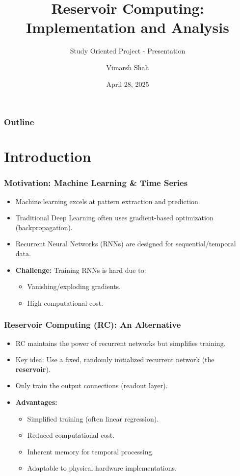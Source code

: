\documentclass{beamer}
\title[Reservoir Computing]{Reservoir Computing: Implementation and Analysis}
\subtitle{Study Oriented Project - Presentation}
\author{Vimarsh Shah}
\institute{Department of Physics \\ BITS Pilani, Goa Campus}
\date{April 28, 2025}
\begin{document}
\frame{\titlepage} %

\begin{frame}
    \frametitle{Outline}
    \tableofcontents
\end{frame}

\section{Introduction}

\begin{frame}
    \frametitle{Motivation: Machine Learning & Time Series}
    \begin{itemize}
        \item Machine learning excels at pattern extraction and prediction.
        \item Traditional Deep Learning often uses gradient-based optimization (backpropagation).
        \item Recurrent Neural Networks (RNNs) are designed for sequential/temporal data.
        \pause
        \item \textbf{Challenge:} Training RNNs is hard due to:
            \begin{itemize}
                \item Vanishing/exploding gradients.
                \item High computational cost.
            \end{itemize}
    \end{itemize}
\end{frame}

\begin{frame}
    \frametitle{Reservoir Computing (RC): An Alternative}
    \begin{itemize}
        \item RC maintains the power of recurrent networks but simplifies training.
        \item Key idea: Use a fixed, randomly initialized recurrent network (the \textbf{reservoir}).
        \item Only train the output connections (readout layer). \pause
        \item \textbf{Advantages:}
            \begin{itemize}
                \item Simplified training (often linear regression).
                \item Reduced computational cost.
                \item Inherent memory for temporal processing.
                \item Adaptable to physical hardware implementations.
            \end{itemize}
    \end{itemize}
\end{frame}
\end{document}
